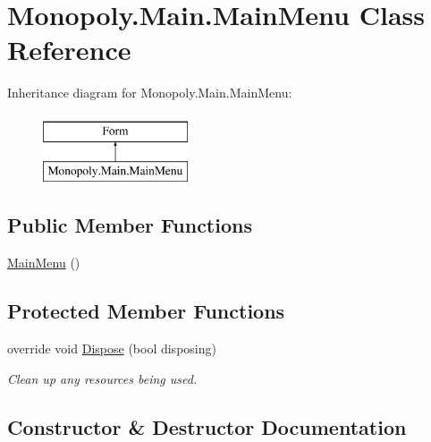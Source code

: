 \hypertarget{class_monopoly_1_1_main_1_1_main_menu}{}\section{Monopoly.\+Main.\+Main\+Menu Class Reference}
\label{class_monopoly_1_1_main_1_1_main_menu}
Inheritance diagram for Monopoly.\+Main.\+Main\+Menu\+:\begin{figure}[H]
\begin{center}
\leavevmode
\includegraphics[height=2.000000cm]{class_monopoly_1_1_main_1_1_main_menu}
\end{center}
\end{figure}
\subsection*{Public Member Functions}
\begin{DoxyCompactItemize}
\item 
\mbox{\hyperlink{class_monopoly_1_1_main_1_1_main_menu_aa3c496de90a63aba0309e335797addeb}{Main\+Menu}} ()
\end{DoxyCompactItemize}
\subsection*{Protected Member Functions}
\begin{DoxyCompactItemize}
\item 
override void \mbox{\hyperlink{class_monopoly_1_1_main_1_1_main_menu_afc9d4151da241e7d1059c2268d20159a}{Dispose}} (bool disposing)
\begin{DoxyCompactList}\small\item\em Clean up any resources being used. \end{DoxyCompactList}\end{DoxyCompactItemize}


\subsection{Constructor \& Destructor Documentation}
\mbox{\label{class_monopoly_1_1_main_1_1_main_menu_aa3c496de90a63aba0309e335797addeb}} 
